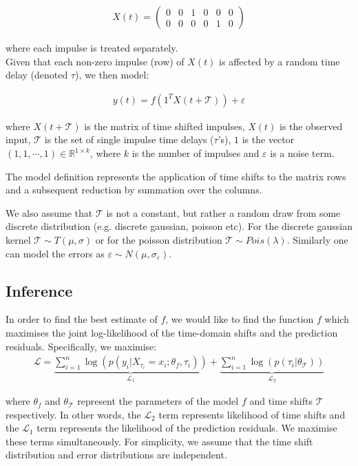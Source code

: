 \documentclass[11pt]{amsart}
\theoremstyle{definition}
\begin{document}
\begin{align*}
X(t) = 
\left(
\begin{array}{cccccc}
0 & 0 & 1 & 0 & 0 & 0 \\
0 & 0 & 0 & 0 & 1 & 0 
\end{array}  
\right)
\end{align*}

where each impulse is treated separately. \\

Given that each non-zero impulse (row) of $X(t)$ is affected by a random time delay (denoted $\tau$), we then model:

\begin{align}\label{Eqn:ModelSpecification}
y(t)= f(1^TX(t + \mathcal{T})) + \varepsilon
\end{align}

where $X(t + \mathcal{T})$ is the matrix of time shifted impulses, $X(t)$ is the observed input, $\mathcal{T}$ is the set of single impulse time delays ($\tau$'s), $1$ is the vector $(1,1,\cdots, 1)\in 
\mathbb{R}^{1 \times k}$, where $k$ is the number of impulses and $\varepsilon$ is a noise term. 

The model definition represents the application of time shifts to the matrix rows and a subsequent reduction by summation over the columns. 

We also assume that $\mathcal{T}$ is not a constant, but rather a random draw from some discrete distribution (e.g. discrete gaussian, poisson etc). For the discrete gaussian kernel $\mathcal{T}\sim T(\mu, \sigma)$ or for the poisson distribution $\mathcal{T}\sim Pois(\lambda)$. Similarly one can model the errors as  $\varepsilon \sim N(\mu, \sigma_{\varepsilon})$. 
\subsection{Inference}

In order to find the best estimate of $f$, we would like to find the function $f$ which maximises the joint log-likelihood of the time-domain shifts and the prediction residuals. Specifically, we maximise:
\begin{align}
    \mathcal{L} = 
    \underbrace{\sum_{i=1}^{n} \log(p(y_i | X_{\tau_i} = x_i; \theta_{f}, \tau_i))}_{\mathcal{L}_1} 
    + 
    \underbrace{\sum_{i=1}^{n} \log(p(\tau_i| \theta_{\mathcal{T}}))}_{\mathcal{L}_2}
\end{align}

where $\theta_{f}$ and $\theta_{\mathcal{T}}$ represent the parameters of the model $f$ and time shifts $\mathcal{T}$ respectively. In other words, the $\mathcal{L}_2$ term represents likelihood of time shifts and the $\mathcal{L}_1$ term represents the likelihood of the prediction residuals. We maximise these terms simultaneously. For simplicity, we assume that the time shift distribution and error distributions are independent. \\
\end{document}
